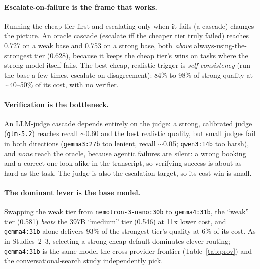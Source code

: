 \documentclass[11pt]{article}
\newcommand{\code}[1]{\texttt{\small #1}}
\newcommand{\TAUORACLE}{0.727}     %
\newcommand{\TAUSTRONG}{0.628}     %
\newcommand{\TAUJUDGEREC}{0.60}    %
\begin{document}
\paragraph{Escalate-on-failure is the frame that works.} Running the cheap tier first and escalating
only when it fails (a cascade) changes the picture. An oracle cascade (escalate iff the cheaper tier
truly failed) reaches \TAUORACLE{} on a weak base and 0.753 on a strong base, both \emph{above}
always-using-the-strongest tier (\TAUSTRONG{}), because it keeps the cheap tier's wins on tasks where
the strong model itself fails. The best cheap, realistic trigger is \emph{self-consistency} (run the
base a few times, escalate on disagreement): 84\% to 98\% of strong quality at $\sim$40--50\% of its
cost, with no verifier.

\paragraph{Verification is the bottleneck.} An LLM-judge cascade depends entirely on the judge: a
strong, calibrated judge (\code{glm-5.2}) reaches recall $\sim$\TAUJUDGEREC{} and the best realistic
quality, but small judges fail in both directions (\code{gemma3:27b} too lenient, recall $\sim$0.05;
\code{qwen3:14b} too harsh), and \emph{none} reach the oracle, because agentic failures are silent:
a wrong booking and a correct one look alike in the transcript, so verifying success is about as
hard as the task. The judge is also the escalation target, so its cost win is small.

\paragraph{The dominant lever is the base model.} Swapping the weak tier from
\code{nemotron-3-nano:30b} to \code{gemma4:31b}, the ``weak'' tier (0.581) \emph{beats} the 397B
``medium'' tier (0.546) at 11x lower cost, and \code{gemma4:31b} alone delivers 93\% of the strongest
tier's quality at 6\% of its cost. As in Studies~2--3, selecting a strong cheap default dominates
clever routing; \code{gemma4:31b} is the same model the cross-provider frontier (Table~\ref{tab:prov})
and the conversational-search study independently pick.
\end{document}

